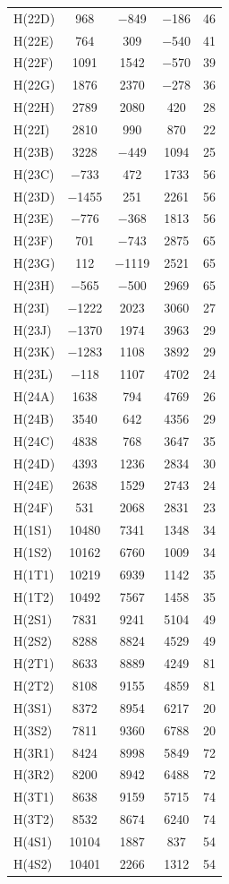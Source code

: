 \begin{center}
{\begin{supertabular}{lcccc}
H(22D)&968&$-$849&$-$186&46\\
H(22E)&764&309&$-$540&41\\
H(22F)&1091&1542&$-$570&39\\
H(22G)&1876&2370&$-$278&36\\
H(22H)&2789&2080&420&28\\
H(22I)&2810&990&870&22\\
H(23B)&3228&$-$449&1094&25\\
H(23C)&$-$733&472&1733&56\\
H(23D)&$-$1455&251&2261&56\\
H(23E)&$-$776&$-$368&1813&56\\
H(23F)&701&$-$743&2875&65\\
H(23G)&112&$-$1119&2521&65\\
H(23H)&$-$565&$-$500&2969&65\\
H(23I)&$-$1222&2023&3060&27\\
H(23J)&$-$1370&1974&3963&29\\
H(23K)&$-$1283&1108&3892&29\\
H(23L)&$-$118&1107&4702&24\\
H(24A)&1638&794&4769&26\\
H(24B)&3540&642&4356&29\\
H(24C)&4838&768&3647&35\\
H(24D)&4393&1236&2834&30\\
H(24E)&2638&1529&2743&24\\
H(24F)&531&2068&2831&23\\
H(1S1)&10480&7341&1348&34\\
H(1S2)&10162&6760&1009&34\\
H(1T1)&10219&6939&1142&35\\
H(1T2)&10492&7567&1458&35\\
H(2S1)&7831&9241&5104&49\\
H(2S2)&8288&8824&4529&49\\
H(2T1)&8633&8889&4249&81\\
H(2T2)&8108&9155&4859&81\\
H(3S1)&8372&8954&6217&20\\
H(3S2)&7811&9360&6788&20\\
H(3R1)&8424&8998&5849&72\\
H(3R2)&8200&8942&6488&72\\
H(3T1)&8638&9159&5715&74\\
H(3T2)&8532&8674&6240&74\\
H(4S1)&10104&1887&837&54\\
H(4S2)&10401&2266&1312&54\\

\end{supertabular}}
\end{center}
